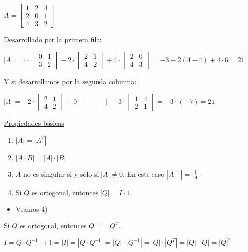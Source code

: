 \documentclass[12pt]{article}
\begin{document}
$A=\begin{bmatrix}
1 & 2 & 4 \\ 
2 & 0 & 1 \\ 
4 & 3 & 2
\end{bmatrix} $

Desarrollado por la primera fila:

$|A|=1\cdot\begin{vmatrix}
0 & 1 \\ 
3 & 2
\end{vmatrix}-2\cdot\begin{vmatrix}
2 & 1 \\ 
4 & 2
\end{vmatrix} +4\cdot\begin{vmatrix}
2 & 0 \\ 
4 & 3
\end{vmatrix}=-3-2(4-4)+4\cdot6=21$

Y si desarrollamos por la segunda columna:

$|A|=-2\cdot\begin{vmatrix}
2 & 1 \\ 
4 & 2
\end{vmatrix}+0\cdot\begin{vmatrix}
~~ & ~~ \\ 
~ & ~
\end{vmatrix}-3\cdot\begin{vmatrix}
1 & 4 \\ 
2 & 1
\end{vmatrix}=-3\cdot(-7)=21$

\hspace{0.5cm}\underline{Propiedades básicas}
\begin{enumerate}[label=\arabic*), leftmargin=*]
    \item $|A|=|A^T|$
    \item $|A\cdot B|=|A|\cdot|B|$
\item $A$ no es singular si y sólo si $|A|\neq0$. En este caso
$|A^{-1}|=\frac{1}{|A|}$
    \item Si $Q$ es ortogonal, entonces $|Q|=I\cdot 1$.
\end{enumerate}

\begin{itemize}[label=$\longrightarrow$]
\item Veamos 4)
\end{itemize}
Si $Q$ es ortogonal, entonces $Q^{-1}=Q^T$.

$I=Q\cdot Q^{-1}\longrightarrow 1=|I|=|Q\cdot
Q^{-1}|=|Q|\cdot|Q^{-1}|=|Q|\cdot|Q^{T}|=|Q|\cdot|Q|=|Q|^2$
\end{document}
